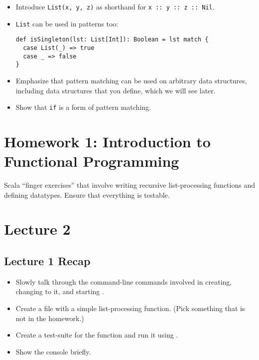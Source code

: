 \documentclass{book}
\begin{document}
\begin{itemize}
\begin{verbatim}
}
\end{verbatim}

\item Introduce \verb|List(x, y, z)| as shorthand for \verb|x :: y :: z :: Nil|.

\item \verb|List| can be used in patterns too:
%
\begin{verbatim}
def isSingleton(lst: List[Int]): Boolean = lst match {
  case List(_) => true
  case _ => false
}
\end{verbatim}

\item Emphasize that pattern matching can be used on arbitrary data structures,
including data structures that you define, which we will see later.

\item Show that \verb|if| is a form of pattern matching.

\end{itemize}

\chapter{Homework 1: Introduction to Functional Programming}

Scala ``finger exercises'' that involve writing recursive list-processing
functions and defining datatypes. Ensure that everything is testable.

\chapter{Lecture 2}

\begin{instructor}

\section{Lecture 1 Recap}

\begin{itemize}

  \item Slowly talk through the command-line commands involved in creating,
  changing to it, and starting \sbt{}.

  \item Create a file with a simple list-processing function. (Pick something
  that is not in the homework.)

  \item Create a test-suite for the function and run it using \sbt{}.

  \item Show the \sbt{} console briefly.

\end{itemize}

\end{instructor}
\end{document}
